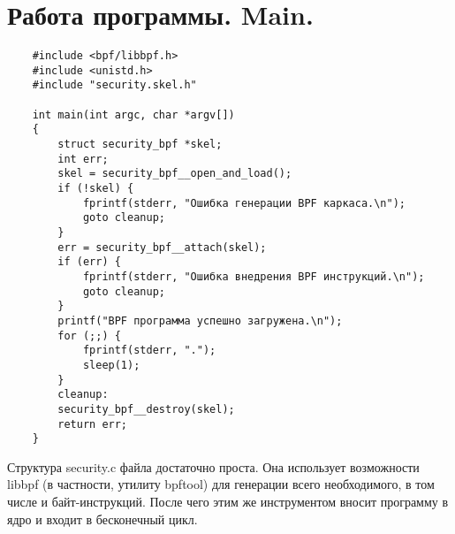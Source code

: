 \section{Работа программы. Main.}
\label{program-main}

\begin{flushleft}

\begin{verbatim}
    #include <bpf/libbpf.h>
    #include <unistd.h>
    #include "security.skel.h"
    
    int main(int argc, char *argv[])
    {
        struct security_bpf *skel;
        int err;
        skel = security_bpf__open_and_load();
        if (!skel) { 
            fprintf(stderr, "Ошибка генерации BPF каркаса.\n");
            goto cleanup;
        }
        err = security_bpf__attach(skel);
        if (err) {
            fprintf(stderr, "Ошибка внедрения BPF инструкций.\n");
            goto cleanup;
        }
        printf("BPF программа успешно загружена.\n");
        for (;;) {
            fprintf(stderr, ".");
            sleep(1);
        }
        cleanup:
        security_bpf__destroy(skel);
        return err;
    }
\end{verbatim}
    Структура security.c файла достаточно проста. Она использует возможности libbpf (в частности, утилиту bpftool) для генерации всего необходимого, в том числе и байт-инструкций. После чего этим же инструментом вносит программу в ядро и входит в бесконечный цикл.
\end{flushleft}